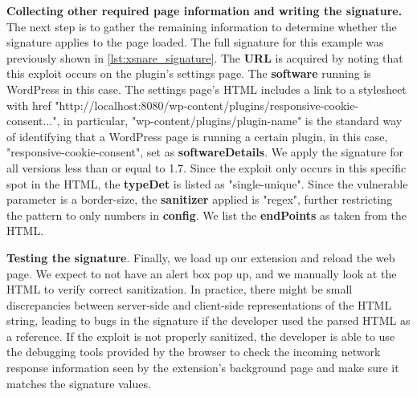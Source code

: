 \textbf{Collecting other required page information and writing the signature.} The next step is to gather the remaining information to determine whether the signature applies to the page loaded. The full signature for this example was previously shown in \autoref{lst:xsnare_signature}. The \textbf{URL} is acquired by noting that this exploit occurs on the plugin's settings page. The \textbf{software} running is WordPress in this case. The settings page's HTML includes a link to a stylesheet with href "http://localhost:8080/wp-content/plugins/responsive-cookie-consent...", in particular, "wp-content/plugins/plugin-name" is the standard way of identifying that a WordPress page is running a certain plugin, in this case, "responsive-cookie-consent", set as \textbf{softwareDetails}. We apply the signature for all versions less than or equal to 1.7. Since the exploit only occurs in this specific spot in the HTML, the \textbf{typeDet} is listed as "single-unique". 
Since the vulnerable parameter is a border-size, the \textbf{sanitizer} applied is "regex", further restricting the pattern to only numbers in \textbf{config}. We list the \textbf{endPoints} as taken from the HTML.

\textbf{Testing the signature}. Finally, we load up our extension and reload the web page. We expect to not have an alert box pop up, and we manually look at the HTML to verify correct sanitization. In practice, there might be small discrepancies between server-side and client-side representations of the HTML string, leading to bugs in the signature if the developer used the parsed HTML as a reference. If the exploit is not properly sanitized, the developer is able to use the debugging tools provided by the browser to check the incoming network response information seen by the extension's background page and make sure it matches the signature values.

\iffalse
